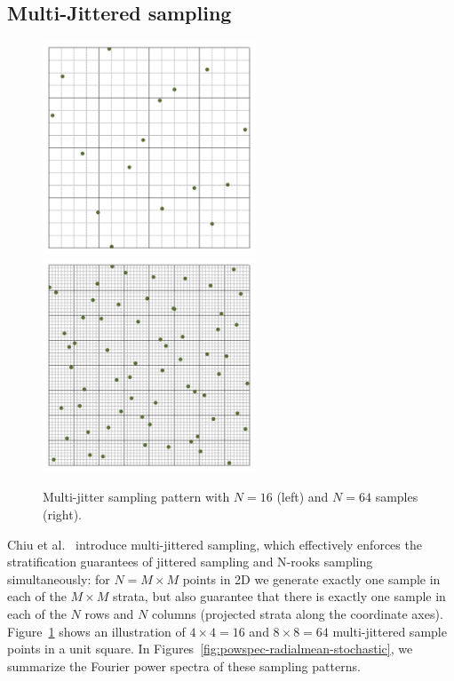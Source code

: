 \documentclass[11pt,fleqn]{book} %
\begin{document}
\subsection{Multi-Jittered sampling}
%
\begin{figure}[ht]
  \centering
  \includegraphics[width=2.5in]{Pictures/pointset-gridvisualize/points-multijitter-n16.pdf}
    \includegraphics[width=2.5in]{./Pictures/pointset-gridvisualize/points-multijitter-n64.pdf}
  \caption{Multi-jitter sampling pattern with $N=16$ (left) and $N = 64$ samples (right).}
  \label{fig:multijitter}
\end{figure}
%
Chiu et al.~\cite{chiu94multi} introduce multi-jittered sampling, which effectively enforces the stratification guarantees of jittered sampling and N-rooks sampling simultaneously: for $N=M\times M$ points in 2D we generate exactly one sample in each of the $M\times M$ strata, but also guarantee that there is exactly one sample in each of the $N$ rows and $N$ columns (projected strata along the coordinate axes). Figure~\ref{fig:multijitter} shows an illustration of  $4\times4 = 16$ and $8\times8 = 64$  multi-jittered sample points in a unit square. In Figures~\ref{fig:powspec-radialmean-stochastic}, we summarize the Fourier power spectra of these sampling patterns.
%

%
\end{document}
